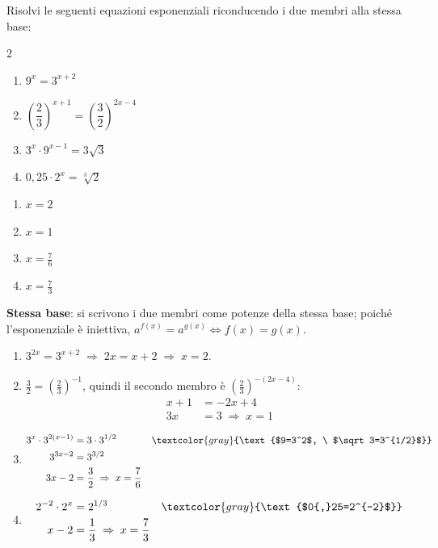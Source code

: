 \begin{question}[ID=3.3, subtitle={Equazioni riconducibili alla stessa base}, difficulty=media, tags={equazioni, esponenziali, proprietà delle potenze}]
Risolvi le seguenti equazioni esponenziali riconducendo i due membri alla stessa base:
\begin{center}\begin{minipage}{0.92\linewidth}
\begin{multicols}{2}
\begin{enumerate}[leftmargin=3.2cm]
\item $9^{x} = 3^{x+2}$
\item $\left(\dfrac{2}{3}\right)^{x+1} = \left(\dfrac{3}{2}\right)^{2x-4}$
\item $3^{x} \cdot 9^{x-1} = 3\sqrt{3}$
\item $0{,}25 \cdot 2^{x} = \sqrt[3]{2}$
\end{enumerate}
\end{multicols}
\end{minipage}\end{center}
\begin{solution}
\begin{enumerate}
    \item $x=2$
    \item $x=1$
    \item $x=\tfrac76$
    \item $x=\tfrac73$
\end{enumerate}
\end{solution}
\begin{explanation}
\textbf{Stessa base}: si scrivono i due membri come potenze della stessa base; poiché l'esponenziale è iniettiva, $a^{f(x)}=a^{g(x)} \iff f(x)=g(x)$.
\begin{enumerate}
    \item $3^{2x}=3^{x+2} \;\Rightarrow\; 2x=x+2 \;\Rightarrow\; x=2$.
    \item $\tfrac32=\left(\tfrac23\right)^{-1}$, quindi il secondo membro è $\left(\tfrac23\right)^{-(2x-4)}$:
    \[\begin{aligned}
    x+1 &= -2x+4\\
    3x &= 3 \;\Rightarrow\; x=1
    \end{aligned}\]
    \item \[\begin{aligned}
    3^x\cdot3^{2(x-1)} &= 3\cdot3^{1/2} && \textcolor{gray}{\text{$9=3^2$, \ $\sqrt3=3^{1/2}$}}\\
    3^{3x-2} &= 3^{3/2}\\
    3x-2 &= \dfrac32 \;\Rightarrow\; x=\dfrac76
    \end{aligned}\]
    \item \[\begin{aligned}
    2^{-2}\cdot2^x &= 2^{1/3} && \textcolor{gray}{\text{$0{,}25=2^{-2}$}}\\
    x-2 &= \dfrac13 \;\Rightarrow\; x=\dfrac73
    \end{aligned}\]
\end{enumerate}
\end{explanation}
\end{question}

